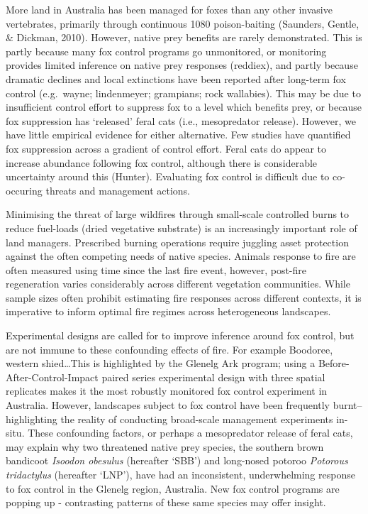 \documentclass[11pt,a4paper,titlepage,twoside,openright]{style/unimelbthesis}
\begin{document}
\begin{mainmatter}
More land in Australia has been managed for foxes than any other invasive vertebrates, primarily through continuous 1080 poison-baiting (Saunders, Gentle, \& Dickman, 2010). However, native prey benefits are rarely demonstrated. This is partly because many fox control programs go unmonitored, or monitoring provides limited inference on native prey responses (reddiex), and partly because dramatic declines and local extinctions have been reported after long-term fox control (e.g.~wayne; lindenmeyer; grampians; rock wallabies). This may be due to insufficient control effort to suppress fox to a level which benefits prey, or because fox suppression has `released' feral cats (i.e., mesopredator release). However, we have little empirical evidence for either alternative. Few studies have quantified fox suppression across a gradient of control effort. Feral cats do appear to increase abundance following fox control, although there is considerable uncertainty around this (Hunter). Evaluating fox control is difficult due to co-occuring threats and management actions.

Minimising the threat of large wildfires through small-scale controlled burns to reduce fuel-loads (dried vegetative substrate) is an increasingly important role of land managers. Prescribed burning operations require juggling asset protection against the often competing needs of native species. Animals response to fire are often measured using time since the last fire event, however, post-fire regeneration varies considerably across different vegetation communities. While sample sizes often prohibit estimating fire responses across different contexts, it is imperative to inform optimal fire regimes across heterogeneous landscapes.

Experimental designs are called for to improve inference around fox control, but are not immune to these confounding effects of fire. For example Boodoree, western shied\ldots This is highlighted by the Glenelg Ark program; using a Before-After-Control-Impact paired series experimental design with three spatial replicates makes it the most robustly monitored fox control experiment in Australia. However, landscapes subject to fox control have been frequently burnt-- highlighting the reality of conducting broad-scale management experiments in-situ. These confounding factors, or perhaps a mesopredator release of feral cats, may explain why two threatened native prey species, the southern brown bandicoot \emph{Isoodon obesulus} (hereafter `SBB') and long-nosed potoroo \emph{Potorous tridactylus} (hereafter `LNP'), have had an inconsistent, underwhelming response to fox control in the Glenelg region, Australia. New fox control programs are popping up - contrasting patterns of these same species may offer insight.


\end{mainmatter}
\end{document}

